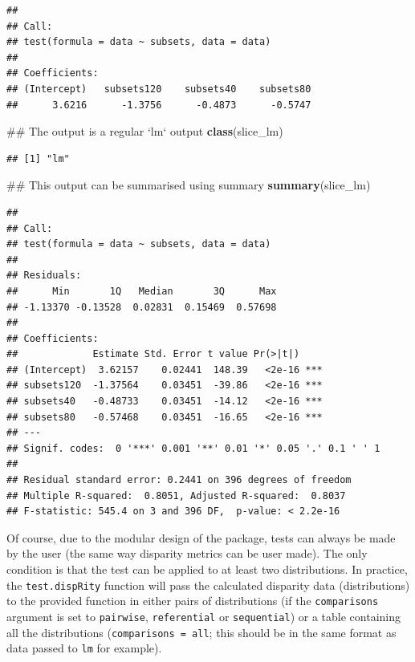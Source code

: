 \documentclass[]{book}
\newenvironment{Shaded}{\begin{snugshade}}{\end{snugshade}}
\newcommand{\KeywordTok}[1]{\textcolor[rgb]{0.13,0.29,0.53}{\textbf{#1}}}
\newcommand{\NormalTok}[1]{#1}
\theoremstyle{definition}
\theoremstyle{definition}
\theoremstyle{remark}
\begin{document}
\begin{verbatim}
## 
## Call:
## test(formula = data ~ subsets, data = data)
## 
## Coefficients:
## (Intercept)   subsets120    subsets40    subsets80  
##      3.6216      -1.3756      -0.4873      -0.5747
\end{verbatim}

\begin{Shaded}
\begin{Highlighting}[]
\NormalTok{## The output is a regular `lm` output}
\KeywordTok{class}\NormalTok{(slice_lm)}
\end{Highlighting}
\end{Shaded}

\begin{verbatim}
## [1] "lm"
\end{verbatim}

\begin{Shaded}
\begin{Highlighting}[]
\NormalTok{## This output can be summarised using summary}
\KeywordTok{summary}\NormalTok{(slice_lm)}
\end{Highlighting}
\end{Shaded}

\begin{verbatim}
## 
## Call:
## test(formula = data ~ subsets, data = data)
## 
## Residuals:
##      Min       1Q   Median       3Q      Max 
## -1.13370 -0.13528  0.02831  0.15469  0.57698 
## 
## Coefficients:
##             Estimate Std. Error t value Pr(>|t|)    
## (Intercept)  3.62157    0.02441  148.39   <2e-16 ***
## subsets120  -1.37564    0.03451  -39.86   <2e-16 ***
## subsets40   -0.48733    0.03451  -14.12   <2e-16 ***
## subsets80   -0.57468    0.03451  -16.65   <2e-16 ***
## ---
## Signif. codes:  0 '***' 0.001 '**' 0.01 '*' 0.05 '.' 0.1 ' ' 1
## 
## Residual standard error: 0.2441 on 396 degrees of freedom
## Multiple R-squared:  0.8051, Adjusted R-squared:  0.8037 
## F-statistic: 545.4 on 3 and 396 DF,  p-value: < 2.2e-16
\end{verbatim}

Of course, due to the modular design of the package, tests can always be
made by the user (the same way disparity metrics can be user made). The
only condition is that the test can be applied to at least two
distributions. In practice, the \texttt{test.dispRity} function will
pass the calculated disparity data (distributions) to the provided
function in either pairs of distributions (if the \texttt{comparisons}
argument is set to \texttt{pairwise}, \texttt{referential} or
\texttt{sequential}) or a table containing all the distributions
(\texttt{comparisons\ =\ all}; this should be in the same format as data
passed to \texttt{lm} for example).
\end{document}
